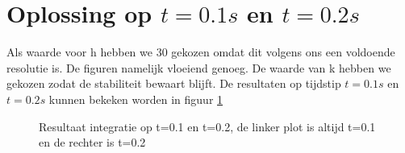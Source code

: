 \documentclass[11pt]{article} %
\begin{document}
\section{Oplossing op $t=0.1s$ en $t=0.2s$}
Als waarde voor h hebben we 30 gekozen omdat dit volgens ons een voldoende resolutie is. De figuren namelijk vloeiend genoeg. De waarde van k hebben we gekozen zodat de stabiliteit bewaart blijft. De resultaten op tijdstip $t=0.1s$ en $t=0.2s$ kunnen bekeken worden in figuur \ref{fig:Deel4}\
	
	\begin{figure}[H]
		\centering
		\caption{Resultaat integratie op t=0.1 en t=0.2, de linker plot is altijd t=0.1 en de rechter is t=0.2}
			\label{fig:Deel4}
	\end{figure}
\end{document}
